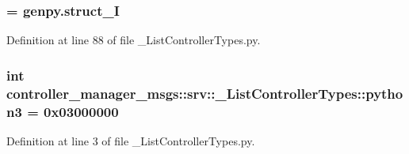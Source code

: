 \subsubsection[{\-\_\-struct\-\_\-\-I}]{ = genpy.\-struct\-\_\-\-I}\label{namespacecontroller__manager__msgs_1_1srv_1_1__ListControllerTypes_ae66dff3c40b7e223877db71efd4b4e5a}


\-Definition at line 88 of file \-\_\-\-List\-Controller\-Types.\-py.

\subsubsection[{python3}]{\setlength{\rightskip}{0pt plus 5cm}int {\bf controller\-\_\-manager\-\_\-msgs\-::srv\-::\-\_\-\-List\-Controller\-Types\-::python3} = 0x03000000}\label{namespacecontroller__manager__msgs_1_1srv_1_1__ListControllerTypes_a3a86d04d0e25629e0ce9546dee1d7619}


\-Definition at line 3 of file \-\_\-\-List\-Controller\-Types.\-py.

